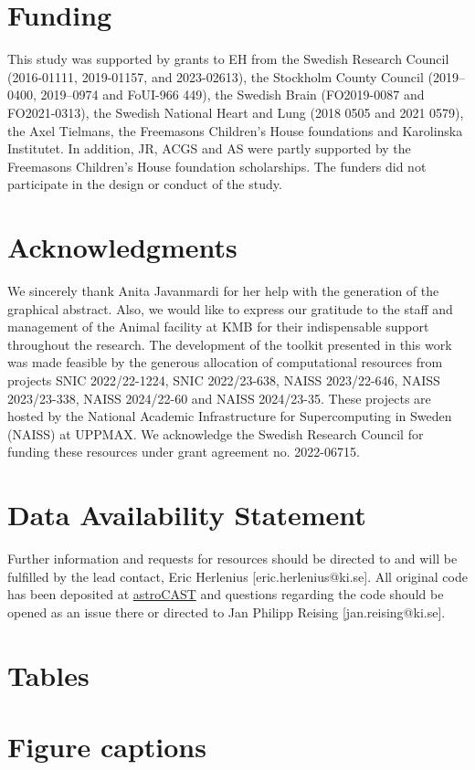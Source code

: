 \documentclass[utf8]{FrontiersinHarvard}
\begin{document}
    \section*{Funding}
    This study was supported by grants to EH from the Swedish Research Council (2016-01111, 2019-01157, and 2023-02613), the Stockholm County Council (2019–0400, 2019–0974 and FoUI-966 449), the Swedish Brain (FO2019-0087 and FO2021-0313), the Swedish National Heart and Lung (2018 0505 and 2021 0579), the Axel Tielmans, the Freemasons Children's House foundations and Karolinska Institutet. In addition, JR, ACGS and AS were partly supported by the Freemasons Children’s House foundation scholarships. The funders did not participate in the design or conduct of the study.

    \section*{Acknowledgments}
    We sincerely thank Anita Javanmardi for her help with the generation of the graphical abstract. Also, we would like to express our gratitude to the staff and management of the Animal facility at KMB for their indispensable support throughout the research. The development of the toolkit presented in this work was made feasible by the generous allocation of computational resources from projects SNIC 2022/22-1224, SNIC 2022/23-638, NAISS 2023/22-646, NAISS 2023/23-338, NAISS 2024/22-60 and NAISS 2024/23-35. These projects are hosted by the National Academic Infrastructure for Supercomputing in Sweden (NAISS) at UPPMAX. We acknowledge the Swedish Research Council for funding these resources under grant agreement no. 2022-06715.

    \section*{Data Availability Statement}
    Further information and requests for resources  should be directed to and will be fulfilled by the lead contact, Eric Herlenius [eric.herlenius@ki.se]. All original code has been deposited at \href{https://github.com/janreising/astroCAST}{astroCAST} and questions regarding the code should be opened as an issue there or directed to Jan Philipp Reising [jan.reising@ki.se].

    

    \section*{Tables}
    

    \section*{Figure captions}
    
\end{document}
